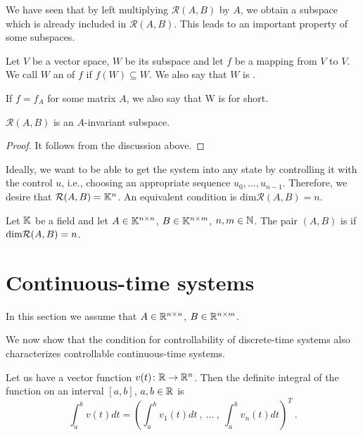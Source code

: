 We have seen that by left multiplying $\mathcal{R}(A,B)$ by $A$, we obtain a subspace which is already included in $\mathcal{R}(A,B)$. This leads to an important property of some subspaces.

\begin{definition}
	Let $V$ be a vector space, $W$ be its subspace and let $f$ be a mapping from $V$ to $V$. We call $W$ an  of $f$ if $f(W)\subseteq W$. We also say that $W$ is . 
	
	If $f=f_A$ for some matrix $A$, we also say that W is  for short.
\end{definition}

\begin{lemma}
	\label{lem:reachinv}
	$\mathcal{R}(A,B)$ is an $A$-invariant subspace.
\end{lemma} 

\begin{proof}
	It follows from the discussion above.
\end{proof}

Ideally, we want to be able to get the system into any state by controlling it with the control $u$, i.e., choosing an appropriate sequence $u_0,\ldots,u_{n-1}$. Therefore, we desire that $\mathcal{R}(A,B)=\mathbb{K}^n$. An equivalent condition is $\text{dim}\mathcal{R}(A,B)=n$.

\begin{definition}
	Let $\mathbb{K}$ be a field and let $A \in \mathbb{K}^{n \times n}$, $B \in \mathbb{K}^{n \times m}$, $n,m \in \mathbb{N}$. The pair $(A,B)$ is  if $\textnormal{dim}\mathcal{R}(A,B)=n$.
\end{definition}

\section{Continuous-time systems}
\label{sec:ct-system}

\begin{remark}
	In this section we assume that $A\in\mathbb{R}^{n\times n}$, $B\in\mathbb{R}^{n\times m}$.
\end{remark}

We now show that the condition for controllability of discrete-time systems also characterizes controllable continuous-time systems.

\begin{definition}
	Let us have a vector function $v(t)\colon\mathbb{R}\to\mathbb{R}^n$. Then the definite integral of the function on an interval $[a,b]$, $a,b\in\mathbb{R}$ is
	$$\int_a^bv(t)dt=\left(\int_a^bv_1(t)dt\ ,\ \ldots\ ,\ \int_a^bv_n(t)dt\right)^T\ .$$
\end{definition}


